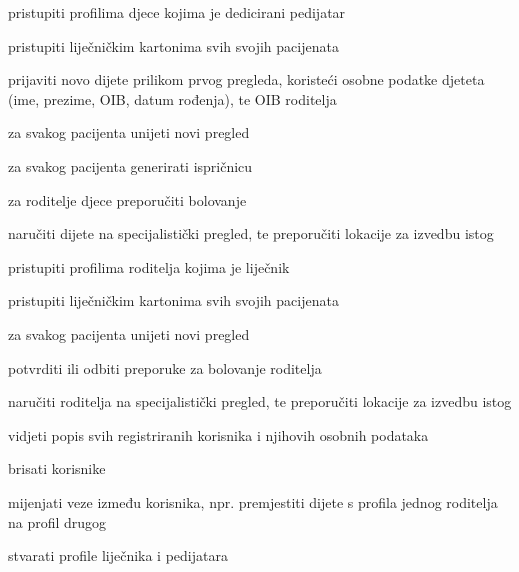 \begin{packed_enum}
\begin{packed_enum}
					\item pristupiti profilima djece kojima je dedicirani pedijatar
					\item pristupiti liječničkim kartonima svih svojih pacijenata
					\item prijaviti novo dijete prilikom prvog pregleda, koristeći osobne podatke djeteta (ime, prezime, OIB, datum rođenja), te OIB roditelja
					\item za svakog pacijenta unijeti novi pregled
					\item za svakog pacijenta generirati ispričnicu
					\item za roditelje djece preporučiti bolovanje
					\item naručiti dijete na specijalistički pregled, te preporučiti lokacije za izvedbu istog
					
				\end{packed_enum}
				
				\item  {}
				
				\begin{packed_enum}
					
					\item pristupiti profilima roditelja kojima je liječnik
					\item pristupiti liječničkim kartonima svih svojih pacijenata
					\item za svakog pacijenta unijeti novi pregled
					\item potvrditi ili odbiti preporuke za bolovanje roditelja
					\item naručiti roditelja na specijalistički pregled, te preporučiti lokacije za izvedbu istog
					
				\end{packed_enum}
				
				\item  {}
				
				\begin{packed_enum}
					
					\item vidjeti popis svih registriranih korisnika i njihovih osobnih podataka
					\item brisati korisnike
					\item mijenjati veze između korisnika, npr. premjestiti dijete s profila jednog roditelja na profil drugog
					\item stvarati profile liječnika i pedijatara
					

\end{packed_enum}
\end{packed_enum}
